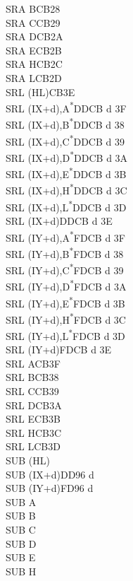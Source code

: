 \documentclass[twoside,openright,a4paper]{book}
\begin{document}
\begin{multicols}{3}
{\begin{tabbing}
	SRA B\>CB28\\
	SRA C\>CB29\\
	SRA D\>CB2A\\
	SRA E\>CB2B\\
	SRA H\>CB2C\\
	SRA L\>CB2D\\
	SRL (HL)\>CB3E\\
	SRL (IX+d),A\textsuperscript{*}\>DDCB d 3F\\
	SRL (IX+d),B\textsuperscript{*}\>DDCB d 38\\
	SRL (IX+d),C\textsuperscript{*}\>DDCB d 39\\
	SRL (IX+d),D\textsuperscript{*}\>DDCB d 3A\\
	SRL (IX+d),E\textsuperscript{*}\>DDCB d 3B\\
	SRL (IX+d),H\textsuperscript{*}\>DDCB d 3C\\
	SRL (IX+d),L\textsuperscript{*}\>DDCB d 3D\\
	SRL (IX+d)\>DDCB d 3E\\
	SRL (IY+d),A\textsuperscript{*}\>FDCB d 3F\\
	SRL (IY+d),B\textsuperscript{*}\>FDCB d 38\\
	SRL (IY+d),C\textsuperscript{*}\>FDCB d 39\\
	SRL (IY+d),D\textsuperscript{*}\>FDCB d 3A\\
	SRL (IY+d),E\textsuperscript{*}\>FDCB d 3B\\
	SRL (IY+d),H\textsuperscript{*}\>FDCB d 3C\\
	SRL (IY+d),L\textsuperscript{*}\>FDCB d 3D\\
	SRL (IY+d)\>FDCB d 3E\\
	SRL A\>CB3F\\
	SRL B\>CB38\\
	SRL C\>CB39\\
	SRL D\>CB3A\\
	SRL E\>CB3B\\
	SRL H\>CB3C\\
	SRL L\>CB3D\\
	SUB (HL)\\
	SUB (IX+d)\>DD96 d\\
	SUB (IY+d)\>FD96 d\\
	SUB A\\
	SUB B\\
	SUB C\\
	SUB D\\
	SUB E\\
	SUB H\\

\end{tabbing}}
\end{multicols}
\end{document}
